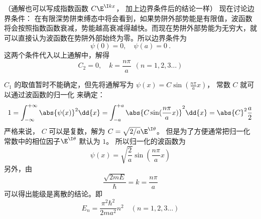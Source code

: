 （通解也可以写成指数函数 $C\E^{\I kx}$， 加上边界条件后的结论一样）
现在讨论边界条件： 在有限深势阱束缚态中将会看到，如果势阱外部势能是有限值，波函数将会按照指数函数衰减，势能越高衰减得越快。而现在势阱外部势能为无穷大，就可以直接认为波函数在势阱外部始终为零。所以边界条件为
\begin{equation}
\psi(0) = 0, \quad \psi(a) = 0~.
\end{equation}
这两个条件代入以上通解中，解得
\begin{equation}
C_2 = 0, \quad k = \frac{n\pi}{a}  \ \ (n = 1,2,3\dots)
\end{equation}

$C_1$ 的取值暂时不能确定，但先将通解写为 $\psi(x) = C\sin(\frac{n\pi }{a}x)$， 常数 $C$ 就可以通过波函数的归一化%
来确定：
\begin{equation}
1 = \int_{-\infty }^{+\infty } \abs{\psi(x)}^2 \dd{x}  = \int_{-a}^{+a} \abs{C\sin(\frac{n\pi }{a} x)}^2 \dd{x}  = \abs{C}^2 \frac{a}{2}
\end{equation}
严格来说， $C$ 可以是复数，解为 $C = \sqrt{2/a} \E^{\I\theta}$。 但是为了方便通常把归一化常数中的相位因子$\E^{\I\theta}$ 默认为 $1$。 所以归一化的波函数为
\begin{equation}
\psi(x) = \sqrt{\frac{2}{a}} \sin(\frac{n\pi }{a}x)
\end{equation}
另外，由
\begin{equation}
\frac{\sqrt{2mE}}{\hbar} = k = \frac{n\pi }{a}
\end{equation}
可以得出能级是离散的结论。即
\begin{equation}
E_n = \frac{\pi^2\hbar^2}{2m a^2} n^2 \quad (n = 1,2,3\dots)
\end{equation}

